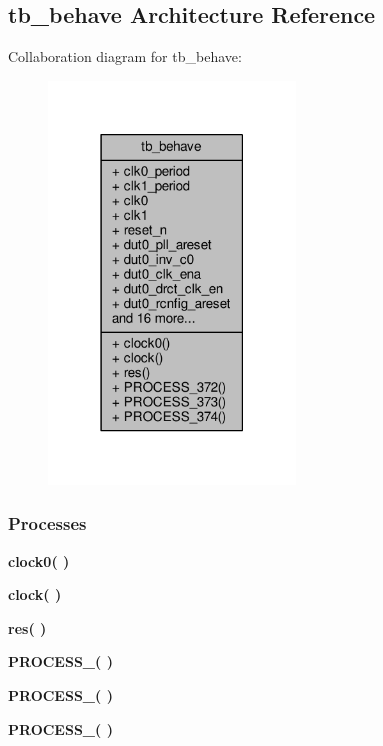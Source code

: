 \subsection{tb\+\_\+behave Architecture Reference}
\label{classrx__pll__top__tb_1_1tb__behave}


Collaboration diagram for tb\+\_\+behave\+:\nopagebreak
\begin{figure}[H]
\begin{center}
\leavevmode
\includegraphics[width=186pt]{d1/d0a/classrx__pll__top__tb_1_1tb__behave__coll__graph}
\end{center}
\end{figure}
\subsubsection*{Processes}
 \begin{DoxyCompactItemize}
\item 
{\bf clock0}{\bfseries  (  )}
\item 
{\bf clock}{\bfseries  (  )}
\item 
{\bf res}{\bfseries  (  )}
\item 
{\bf P\+R\+O\+C\+E\+S\+S\+\_}{\bfseries  (  )}
\item 
{\bf P\+R\+O\+C\+E\+S\+S\+\_}{\bfseries  (  )}
\item 
{\bf P\+R\+O\+C\+E\+S\+S\+\_}{\bfseries  (  )}
\end{DoxyCompactItemize}
